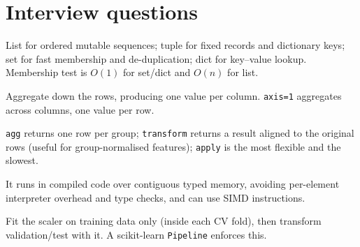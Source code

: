 \section{Interview questions}
\A List for ordered mutable sequences; tuple for fixed records and dictionary keys; set for fast membership and de-duplication; dict for key--value lookup. Membership test is $O(1)$ for set/dict and $O(n)$ for list.

\A Aggregate down the rows, producing one value per column. \texttt{axis=1} aggregates across columns, one value per row.

\A \texttt{agg} returns one row per group; \texttt{transform} returns a result aligned to the original rows (useful for group-normalised features); \texttt{apply} is the most flexible and the slowest.

\A It runs in compiled code over contiguous typed memory, avoiding per-element interpreter overhead and type checks, and can use SIMD instructions.

\A Fit the scaler on training data only (inside each CV fold), then transform validation/test with it. A scikit-learn \texttt{Pipeline} enforces this.
